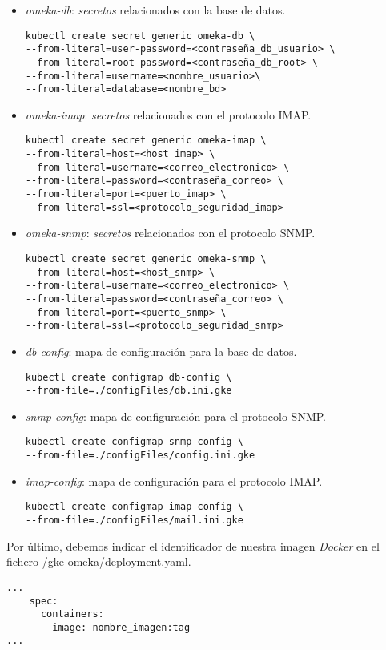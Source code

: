 \begin{itemize}
\tightlist
\item
  \emph{omeka-db}: \emph{secretos} relacionados con la base de datos.
  \begin{verbatim}
kubectl create secret generic omeka-db \
--from-literal=user-password=<contraseña_db_usuario> \
--from-literal=root-password=<contraseña_db_root> \
--from-literal=username=<nombre_usuario>\
--from-literal=database=<nombre_bd>
  \end{verbatim}
\item
  \emph{omeka-imap}: \emph{secretos} relacionados con el protocolo IMAP.
    \begin{verbatim}
kubectl create secret generic omeka-imap \
--from-literal=host=<host_imap> \
--from-literal=username=<correo_electronico> \
--from-literal=password=<contraseña_correo> \
--from-literal=port=<puerto_imap> \
--from-literal=ssl=<protocolo_seguridad_imap>
  \end{verbatim}
\item
  \emph{omeka-snmp}: \emph{secretos} relacionados con el protocolo SNMP.
    \begin{verbatim}
kubectl create secret generic omeka-snmp \
--from-literal=host=<host_snmp> \
--from-literal=username=<correo_electronico> \
--from-literal=password=<contraseña_correo> \
--from-literal=port=<puerto_snmp> \
--from-literal=ssl=<protocolo_seguridad_snmp>
  \end{verbatim}
  \item
  \emph{db-config}: mapa de configuración para la base de datos.
    \begin{verbatim}
kubectl create configmap db-config \
--from-file=./configFiles/db.ini.gke
  \end{verbatim}
    \item
  \emph{snmp-config}: mapa de configuración para el protocolo SNMP.
    \begin{verbatim}
kubectl create configmap snmp-config \
--from-file=./configFiles/config.ini.gke
  \end{verbatim}
      \item
  \emph{imap-config}: mapa de configuración para el protocolo IMAP.
    \begin{verbatim}
kubectl create configmap imap-config \
--from-file=./configFiles/mail.ini.gke
  \end{verbatim}
\end{itemize}

Por último, debemos indicar el identificador de nuestra imagen
\emph{Docker} en el fichero {/gke-omeka/deployment.yaml}.
\begin{verbatim}
...
    spec:
      containers:
      - image: nombre_imagen:tag
...
\end{verbatim}

